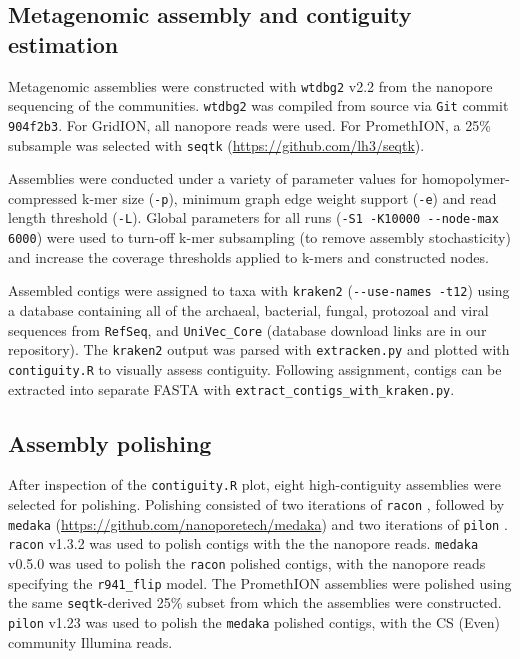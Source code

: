 \documentclass[a4paper,num-refs]{oup-contemporary}
\begin{document}
\subsection{Metagenomic assembly and contiguity estimation}
Metagenomic assemblies were constructed with \texttt{wtdbg2} v2.2 \cite{ruan2019fast} from the nanopore sequencing of the communities.
\texttt{wtdbg2} was compiled from source via \texttt{Git} commit \texttt{904f2b3}. For GridION, all nanopore reads were used. For PromethION, a 25\% subsample was selected with \texttt{seqtk} (\url{https://github.com/lh3/seqtk}).

Assemblies were conducted under a variety of parameter values for homopolymer-compressed k-mer size (\texttt{-p}), minimum graph edge weight support (\texttt{-e}) and read length threshold (\texttt{-L}). Global parameters for all runs (\texttt{-S1 -K10000 -{}-node-max 6000}) were used to turn-off k-mer subsampling (to remove assembly stochasticity) and increase the coverage thresholds applied to k-mers and constructed nodes.

Assembled contigs were assigned to taxa with \texttt{kraken2} \cite{Wood2014} (\texttt{-{}-use-names -t12}) using a database containing all of the archaeal, bacterial, fungal, protozoal and viral sequences from \texttt{RefSeq}, and \texttt{UniVec\_Core} (database download links are in our repository).
The \texttt{kraken2} output was parsed with \texttt{extracken.py} and plotted with \texttt{contiguity.R} to visually assess contiguity.
Following assignment, contigs can be extracted into separate FASTA with \texttt{extract\_contigs\_with\_kraken.py}.

\subsection{Assembly polishing}
After inspection of the \texttt{contiguity.R} plot, eight high-contiguity assemblies were selected for polishing.
Polishing consisted of two iterations of \texttt{racon} \cite{vaser2017fast}, followed by \texttt{medaka} (\url{https://github.com/nanoporetech/medaka}) and two iterations of \texttt{pilon} \cite{walker2014pilon}.
\texttt{racon} v1.3.2 was used to polish contigs with the the nanopore reads.
\texttt{medaka} v0.5.0 was used to polish the \texttt{racon} polished contigs, with the nanopore reads specifying the \texttt{r941\_flip} model.
The PromethION assemblies were polished using the same \texttt{seqtk}-derived 25\% subset from which the assemblies were constructed.
\texttt{pilon} v1.23 was used to polish the \texttt{medaka} polished contigs, with the CS (Even) community Illumina reads.
\end{document}
